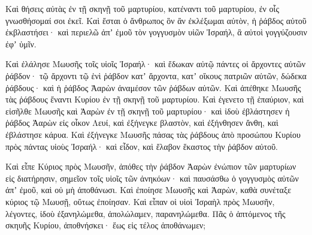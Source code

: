 {Καὶ θήσεις αὐτὰς ἐν τῇ σκηνῇ τοῦ μαρτυρίου, κατέναντι τοῦ μαρτυρίου, ἐν οἷς γνωσθήσομαί σοι ἐκεῖ.
Καὶ ἔσται ὁ ἄνθρωπος ὃν ἂν ἐκλέξωμαι αὐτὸν, ἡ ῥάβδος αὐτοῦ ἐκβλαστήσει· καὶ περιελῶ ἀπʼ ἐμοῦ τὸν γογγυσμὸν υἱῶν Ἰσραήλ, ἃ αὐτοὶ γογγύζουσιν ἐφʼ ὑμῖν.
\par }{\PP {}Καὶ ἐλάλησε Μωυσῆς τοῖς υἱοῖς Ἰσραήλ· καὶ ἔδωκαν αὐτῷ πάντες οἱ ἄρχοντες αὐτῶν ῥάβδον· τῷ ἄρχοντι τῷ ἑνὶ ῥάβδον κατʼ ἄρχοντα, κατʼ οἴκους πατριῶν αὐτῶν, δώδεκα ῥάβδους· καὶ ἡ ῥάβδος Ἀαρὼν ἀναμέσον τῶν ῥάβδων αὐτῶν.
Καὶ ἀπέθηκε Μωυσῆς τὰς ῥάβδους ἔναντι Κυρίου ἐν τῇ σκηνῇ τοῦ μαρτυρίου.
Καὶ ἐγενετο τῇ ἐπαύριον, καὶ εἰσῆλθε Μωυσῆς καὶ Ἀαρὼν ἐν τῇ σκηνῇ τοῦ μαρτυρίου· καὶ ἰδοὺ ἐβλάστησεν ἡ ῥάβδος Ἀαρὼν εἰς οἶκον Λευί, καὶ ἐξήνεγκε βλαστὸν, καὶ ἐξήνθησεν ἄνθη, καὶ ἐβλάστησε κάρυα.
Καὶ ἐξήνεγκε Μωυσῆς πάσας τὰς ῥάβδους ἀπὸ προσώπου Κυρίου πρὸς πάντας υἱοὺς Ἰσραήλ· καὶ εἶδον, καὶ ἔλαβον ἕκαστος τὴν ῥάβδον αὐτοῦ.
\par }{\PP {}Καὶ εἶπε Κύριος πρὸς Μωυσῆν, ἀπόθες τὴν ῥάβδον Ἀαρὼν ἐνώπιον τῶν μαρτυρίων εἰς διατήρησιν, σημεῖον τοῖς υἱοῖς τῶν ἀνηκόων· καὶ παυσάσθω ὁ γογγυσμὸς αὐτῶν ἀπʼ ἐμοῦ, καὶ οὐ μὴ ἀποθάνωσι.
Καὶ ἐποίησε Μωυσῆς καὶ Ἀαρὼν, καθὰ συνέταξε κύριος τῷ Μωυσῇ, οὕτως ἐποίησαν.
Καὶ εἶπαν οἱ υἱοὶ Ἰσραὴλ πρὸς Μωυσῆν, λέγοντες, ἰδοὺ ἐξανηλώμεθα, ἀπολώλαμεν, παρανηλώμεθα.
Πᾶς ὁ ἁπτόμενος τῆς σκηυῆς Κυρίου, ἀποθνήσκει· ἕως εἰς τέλος ἀποθάνωμεν;

}
